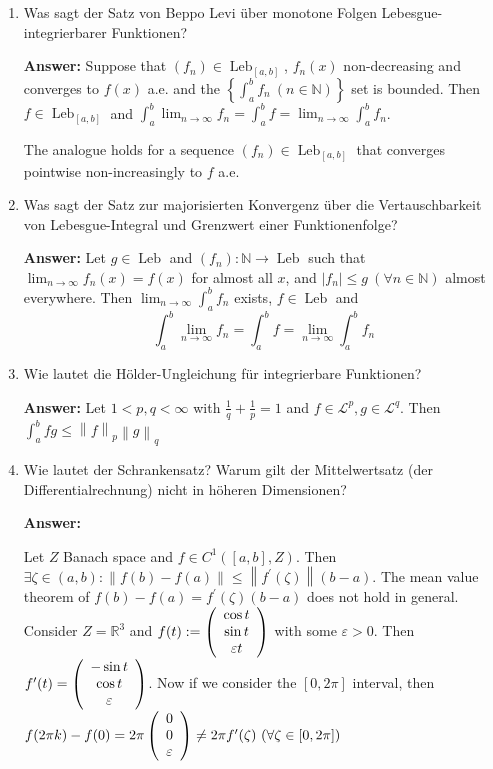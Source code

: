 \documentclass[11pt]{article}
\newcommand{\norm}[1]{\left\lVert#1\right\rVert}
\newcommand{\abs}[1]{\left|#1\right|}
\newcommand{\RR}[0]{\mathbb{R}}
\newcommand{\NN}[0]{\mathbb{N}}
\DeclareMathOperator{\Leb}{Leb}
\begin{document}
\begin{enumerate}
    \item Was sagt der Satz von Beppo Levi über monotone Folgen Lebesgue-integrierbarer Funktionen?

    \textbf{Answer:} Suppose that $(f_n) \in \Leb_{[a, b]}$, $f_n(x)$ non-decreasing and converges to $f(x)$ a.e. and the $\left\{\int_a^b f_n~(n\in\NN)\right\}$ set is bounded. Then $f \in \Leb_{[a, b]}$ and $\int_a^b \lim_{n \to \infty} f_n = \int_a^b f = \lim_{n\to\infty}\int_a^b f_n$.

    The analogue holds for a sequence $(f_n) \in \Leb_{[a, b]}$ that converges pointwise non-increasingly to $f$ a.e.

    \item Was sagt der Satz zur majorisierten Konvergenz über die Vertauschbarkeit von Lebesgue-Integral und Grenzwert einer Funktionenfolge?

    \textbf{Answer:} Let $g \in \Leb$ and $(f_n): \NN \to \Leb$ such that $\lim_{n\to\infty}f_n(x) = f(x)$ for almost all $x$, and $\abs{f_n} \le g~(\forall n \in \NN)$ almost everywhere. Then $\lim_{n \to \infty} \int_a^b f_n$ exists, $f \in \Leb$ and $$ \int_a^b \lim_{n\to\infty}f_n = \int_a^b f = \lim_{n \to \infty} \int_a^b f_n$$

    \item Wie lautet die Hölder-Ungleichung für integrierbare Funktionen?

    \textbf{Answer:} Let $1 < p, q < \infty$ with  $\frac{1}{q} + \frac{1}{p} = 1$ and $f \in \mathcal{L}^p, g \in \mathcal{L}^q$. Then $\int_a^b f g \le \norm{f}_p \norm{g}_q$

    \item Wie lautet der Schrankensatz? Warum gilt der Mittelwertsatz (der Differentialrechnung) nicht in höheren Dimensionen?

    \textbf{Answer:}

    Let $Z$ Banach space and $f \in C^1([a, b], Z)$. Then $\exists \zeta \in (a, b)\colon \norm{f(b) - f(a)} \le \norm{f^\prime(\zeta)}(b-a)$.
    The mean value theorem of $f(b) - f(a) = f^\prime(\zeta)(b-a)$ does not hold in general. Consider $Z = \RR^3$ and $f(t) := \left(\begin{array}[]{c}
        \cos{t}\\\sin{t}\\\varepsilon t
    \end{array}\right)$ with some $\varepsilon > 0$. Then $f^\prime(t) =\left(\begin{array}[]{c}
        -\sin{t}\\\cos{t}\\\varepsilon
    \end{array}\right)$. Now if we consider the $[0, 2\pi]$ interval, then $f(2\pi k) - f(0) = 2\pi \left(\begin{array}[]{c}
        0\\0\\\varepsilon
    \end{array}\right) \neq 2\pi f^\prime(\zeta)~(\forall \zeta \in [0, 2\pi])$


\end{enumerate}
\end{document}
